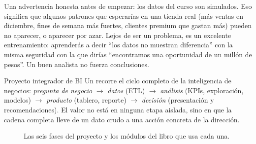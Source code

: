 Una advertencia honesta antes de empezar: los datos del curso son simulados.
Eso significa que algunos patrones que esperarías en una tienda real (más
ventas en diciembre, fines de semana más fuertes, clientes premium que gastan
más) pueden no aparecer, o aparecer por azar. Lejos de ser un problema, es un
excelente entrenamiento: aprenderás a decir ``los datos no muestran
diferencia'' con la misma seguridad con la que dirías ``encontramos una
oportunidad de un millón de pesos''. Un buen analista no fuerza conclusiones.

\begin{concepto}{Proyecto integrador de BI}
Un  recorre el ciclo completo de la
inteligencia de negocios: \emph{pregunta de negocio} $\rightarrow$
\emph{datos} (ETL) $\rightarrow$ \emph{análisis} (KPIs, exploración,
modelos) $\rightarrow$ \emph{producto} (tablero, reporte) $\rightarrow$
\emph{decisión} (presentación y recomendaciones). El valor no está en
ninguna etapa aislada, sino en que la cadena completa lleve de un dato crudo
a una acción concreta de la dirección.
\end{concepto}

\begin{figure}[H]
\centering
{}
\caption{Las seis fases del proyecto y los módulos del libro que usa cada una.}
\label{fig:m09-fases}
\end{figure}

